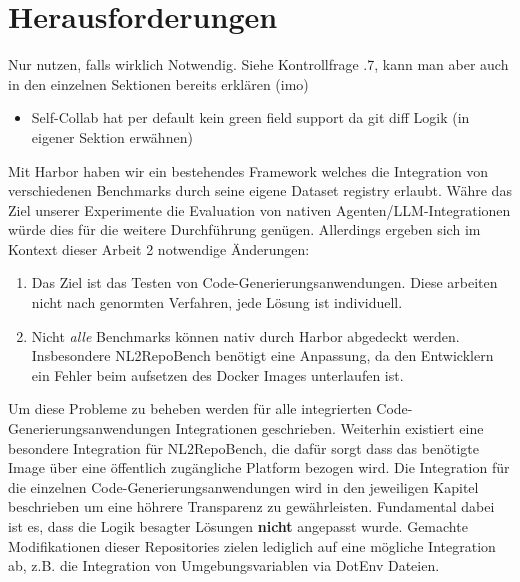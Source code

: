 \section{Herausforderungen}\label{ch:Herausforderungen}

Nur nutzen, falls wirklich Notwendig. Siehe Kontrollfrage .7, kann man aber auch in den einzelnen Sektionen bereits erklären (imo)

\begin{itemize}
    \item Self-Collab hat per default kein green field support da git diff Logik (in eigener Sektion erwähnen)
\end{itemize}


Mit Harbor haben wir ein bestehendes Framework welches die Integration von verschiedenen Benchmarks durch seine eigene Dataset registry erlaubt. Währe das Ziel unserer Experimente die Evaluation von nativen Agenten/LLM-Integrationen würde dies für die weitere Durchführung genügen. Allerdings ergeben sich im Kontext dieser Arbeit 2 notwendige Änderungen:

\begin{enumerate}
    \item Das Ziel ist das Testen von Code-Generierungsanwendungen. Diese arbeiten nicht nach genormten Verfahren, jede Lösung ist individuell.
    \item Nicht \textit{alle} Benchmarks können nativ durch Harbor abgedeckt werden. Insbesondere NL2RepoBench benötigt eine Anpassung, da den Entwicklern ein Fehler beim aufsetzen des Docker Images unterlaufen ist.
\end{enumerate}

Um diese Probleme zu beheben werden für alle integrierten Code-Generierungsanwendungen Integrationen geschrieben. Weiterhin existiert eine besondere Integration für NL2RepoBench, die dafür sorgt dass das benötigte Image über eine öffentlich zugängliche Platform bezogen wird. Die Integration für die einzelnen Code-Generierungsanwendungen wird in den jeweiligen Kapitel beschrieben um eine höhrere Transparenz zu gewährleisten. Fundamental dabei ist es, dass die Logik besagter Lösungen \textbf{nicht} angepasst wurde. Gemachte Modifikationen dieser Repositories zielen lediglich auf eine mögliche Integration ab, z.B. die Integration von Umgebungsvariablen via DotEnv Dateien.



